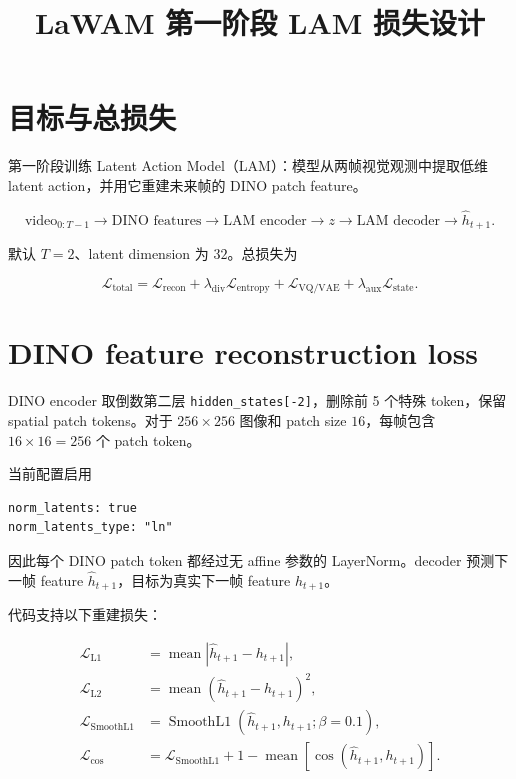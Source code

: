 \documentclass[UTF8,a4paper,11pt]{ctexart}
\title{LaWAM 第一阶段 LAM 损失设计}
\author{}
\date{}
\begin{document}
\maketitle

\section{目标与总损失}

第一阶段训练 Latent Action Model（LAM）：模型从两帧视觉观测中提取低维 latent action，并用它重建未来帧的 DINO patch feature。

\begin{equation*}
\text{video}_{0:T-1}
\rightarrow \text{DINO features}
\rightarrow \text{LAM encoder}
\rightarrow z
\rightarrow \text{LAM decoder}
\rightarrow \widehat{h}_{t+1}.
\end{equation*}

默认 $T=2$、latent dimension 为 $32$。总损失为

\begin{equation}
\mathcal{L}_{\mathrm{total}}
=\mathcal{L}_{\mathrm{recon}}
+\lambda_{\mathrm{div}}\mathcal{L}_{\mathrm{entropy}}
+\mathcal{L}_{\mathrm{VQ/VAE}}
+\lambda_{\mathrm{aux}}\mathcal{L}_{\mathrm{state}}.
\end{equation}

\section{DINO feature reconstruction loss}

DINO encoder 取倒数第二层 \texttt{hidden\_states[-2]}，删除前 5 个特殊 token，保留 spatial patch tokens。对于 $256\times256$ 图像和 patch size $16$，每帧包含 $16\times16=256$ 个 patch token。

当前配置启用

\begin{verbatim}
norm_latents: true
norm_latents_type: "ln"
\end{verbatim}

因此每个 DINO patch token 都经过无 affine 参数的 LayerNorm。decoder 预测下一帧 feature $\widehat{h}_{t+1}$，目标为真实下一帧 feature $h_{t+1}$。

代码支持以下重建损失：

\begin{align*}
\mathcal{L}_{\mathrm{L1}}
&=\operatorname{mean}|\widehat{h}_{t+1}-h_{t+1}|,\\
\mathcal{L}_{\mathrm{L2}}
&=\operatorname{mean}(\widehat{h}_{t+1}-h_{t+1})^2,\\
\mathcal{L}_{\mathrm{SmoothL1}}
&=\operatorname{SmoothL1}(\widehat{h}_{t+1},h_{t+1};\beta=0.1),\\
\mathcal{L}_{\mathrm{cos}}
&=\mathcal{L}_{\mathrm{SmoothL1}}
+1-\operatorname{mean}[\cos(\widehat{h}_{t+1},h_{t+1})].
\end{align*}
\end{document}
